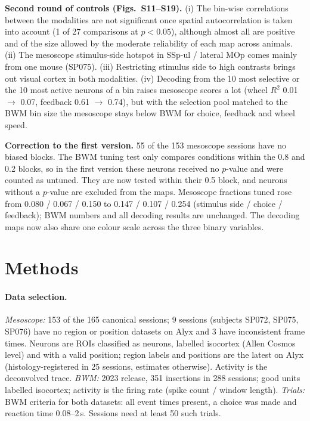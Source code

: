 \documentclass[10pt]{article}
\begin{document}
\textbf{Second round of controls (Figs.~S11--S19).} (i) The bin-wise correlations between the modalities are not significant once spatial autocorrelation is taken into account (1 of 27 comparisons at $p<0.05$), although almost all are positive and of the size allowed by the moderate reliability of each map across animals. (ii) The mesoscope stimulus-side hotspot in SSp-ul / lateral MOp comes mainly from one mouse (SP075). (iii) Restricting stimulus side to high contrasts brings out visual cortex in both modalities. (iv) Decoding from the 10 most selective or the 10 most active neurons of a bin raises mesoscope scores a lot (wheel $R^2$ 0.01 $\to$ 0.07, feedback 0.61 $\to$ 0.74), but with the selection pool matched to the BWM bin size the mesoscope stays below BWM for choice, feedback and wheel speed.

\textbf{Correction to the first version.} 55 of the 153 mesoscope sessions have no biased blocks. The BWM tuning test only compares conditions within the 0.8 and 0.2 blocks, so in the first version these neurons received no $p$-value and were counted as untuned. They are now tested within their 0.5 block, and neurons without a $p$-value are excluded from the maps. Mesoscope fractions tuned rose from 0.080 / 0.067 / 0.150 to 0.147 / 0.107 / 0.254 (stimulus side / choice / feedback); BWM numbers and all decoding results are unchanged. The decoding maps now also share one colour scale across the three binary variables.

\section*{Methods}
\paragraph{Data selection.}
\emph{Mesoscope:} 153 of the 165 canonical sessions; 9 sessions (subjects SP072, SP075, SP076) have no region or position datasets on Alyx and 3 have inconsistent frame times. Neurons are ROIs classified as neurons, labelled isocortex (Allen Cosmos level) and with a valid position; region labels and positions are the latest on Alyx (histology-registered in 25 sessions, estimates otherwise). Activity is the deconvolved trace. \emph{BWM:} 2023 release, 351 insertions in 288 sessions; good units labelled isocortex; activity is the firing rate (spike count / window length). \emph{Trials:} BWM criteria for both datasets: all event times present, a choice was made and reaction time 0.08--2\,s. Sessions need at least 50 such trials.
\end{document}

